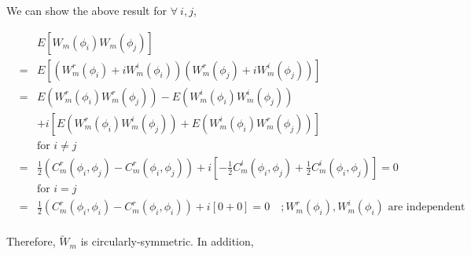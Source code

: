 	We can show the above result for $\forall\ i,j$,
			
	\begin{eqnarray*}
		& & E[W_m(\phi_i) W_m(\phi_j) ]\\
		&=& E[(W_m^r(\phi_i) + i W_m^i(\phi_i))(W_m^r(\phi_j) + i W_m^i(\phi_j))] \\
		&=& E(W_m^r(\phi_i)W_m^r(\phi_j)) - E(W_m^i(\phi_i)W_m^i(\phi_j)) \\
		& & + i[E(W_m^r(\phi_i)W_m^i(\phi_j)) + E(W_m^i(\phi_i)W_m^r(\phi_j))] \\
		& & \mbox{for $i \ne j$} \\
		&=& \frac{1}{2}(C_m^r(\phi_i, \phi_j) - C_m^r(\phi_i, \phi_j)) + i [-\frac{1}{2} C_m^i(\phi_i, \phi_j) + \frac{1}{2}C_m^i(\phi_i, \phi_j)] = 0 \\
		& & \mbox{for $i = j$} \\
		&=& \frac{1}{2}(C_m^r(\phi_i, \phi_i) - C_m^r(\phi_i, \phi_i)) + i [0 + 0] = 0 \quad ;W_m^r(\phi_i),W_m^i(\phi_i) \text{ are independent}  \\
	\end{eqnarray*}
			
			
	Therefore, $\utilde{W}_m$ is circularly-symmetric. In addition,
			
